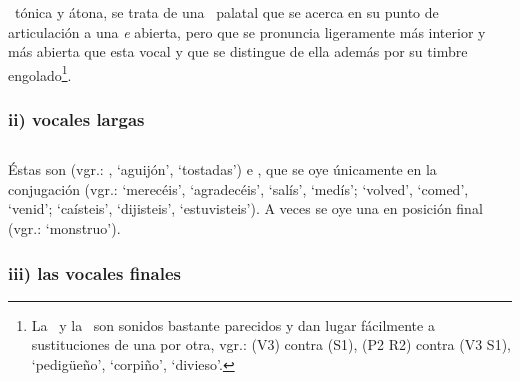 \apt\ tónica y átona, se trata de una \apt\ palatal que se acerca en su punto
de articulación a una \emph{e} abierta, pero que se pronuncia ligeramente más
interior y más abierta que esta vocal y que se distingue de ella además por su
timbre engolado\footnote{La \ic\ y la \uc\ son sonidos bastante parecidos y
dan lugar fácilmente a sustituciones de una por otra, vgr.:
 (V3) contra
 (S1),
 (P2 R2) contra
 (V3 S1),
 `pedigüeño',
 `corpiño',
 `divieso'.}.

\subsubsection*{ii) vocales largas}

\subsection{} Éstas son  (vgr.:
,
 `aguijón',
 `tostadas') e
, que se oye
únicamente en la conjugación (vgr.:
 `merecéis',
 `agradecéis',
 `salís',
 `medís';
 `volved',
 `comed',
 `venid';
`caísteis',
`dijisteis',
`estuvisteis'). A veces se oye una \textipa{[u\rfeLong]} en posición final
(vgr.:  `monstruo').

\subsubsection*{iii) las vocales finales}

